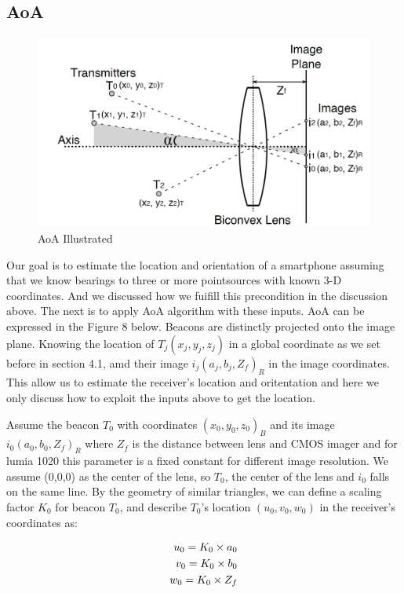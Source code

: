 \documentclass[a4paper, 11pt]{article} %
\begin{document}
\subsection{AoA}
\begin{figure}[h]
	\centering 
	\includegraphics[width=0.8\linewidth]{Figure8.png}
	\caption{AoA Illustrated}
	\label{fig:subfig}
\end{figure}
Our goal is to estimate the location and orientation of a smartphone assuming that we know bearings to three or more pointsources with known 3-D coordinates. And we discussed how we fuifill this precondition in the discussion above. The next is to apply AoA algorithm\cite{AoA} with these inputs. 
AoA can be expressed in the Figure 8 below. Beacons are distinctly projected onto the image plane. Knowing the location of $T_j(x_j, y_j, z_j)$ in a global coordinate as we set before in section 4.1, amd their image $i_j(a_j, b_j, Z_f)_R$ in the image coordinates. This allow us to estimate the receiver's location and oritentation and here we only discuss how to exploit the inputs above to get the location.

Assume the beacon $T_0$ with coordinates $(x_0, y_0, z_0)_B$ and its image $i_0(a_0, b_0, Z_f)_R$ where $Z_f$ is the distance between lens and CMOS imager and for lumia 1020 this parameter is a fixed constant for different image resolution. We assume (0,0,0) as the center of the lens, so $T_0$, the center of the lens and $i_0$ falls on the same line. By the geometry of similar triangles, we can define a scaling factor $K_0$ for beacon $T_0$, and describe $T_0$'s location $(u_0, v_0, w_0)$ in the receiver's coordinates as:

 \begin{equation*}
 \centering
 \begin{split}
 u_0 = K_0 \times a_0 \\
 v_0 = K_0 \times b_0 \\
 w_0 = K_0 \times Z_f
 \end{split}
 \end{equation*}
\end{document}

